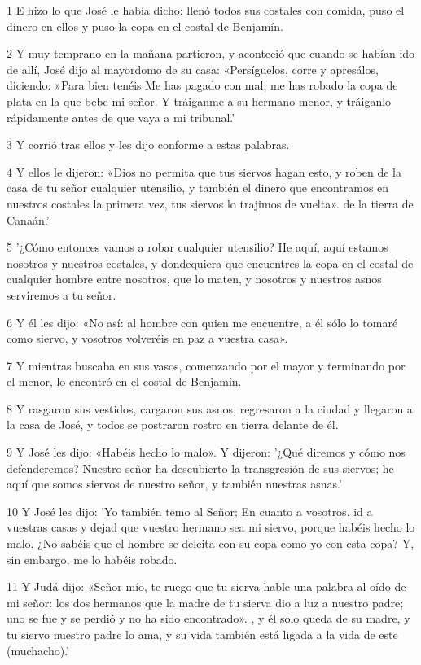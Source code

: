 \par 1 E hizo lo que José le había dicho: llenó todos sus costales con comida, puso el dinero en ellos y puso la copa en el costal de Benjamín.
\par 2 Y muy temprano en la mañana partieron, y aconteció que cuando se habían ido de allí, José dijo al mayordomo de su casa: «Persíguelos, corre y apresálos, diciendo: »Para bien tenéis Me has pagado con mal; me has robado la copa de plata en la que bebe mi señor. Y tráiganme a su hermano menor, y tráiganlo rápidamente antes de que vaya a mi tribunal.'
\par 3 Y corrió tras ellos y les dijo conforme a estas palabras.
\par 4 Y ellos le dijeron: «Dios no permita que tus siervos hagan esto, y roben de la casa de tu señor cualquier utensilio, y también el dinero que encontramos en nuestros costales la primera vez, tus siervos lo trajimos de vuelta». de la tierra de Canaán.'
\par 5 '¿Cómo entonces vamos a robar cualquier utensilio? He aquí, aquí estamos nosotros y nuestros costales, y dondequiera que encuentres la copa en el costal de cualquier hombre entre nosotros, que lo maten, y nosotros y nuestros asnos serviremos a tu señor.
\par 6 Y él les dijo: «No así: al hombre con quien me encuentre, a él sólo lo tomaré como siervo, y vosotros volveréis en paz a vuestra casa».
\par 7 Y mientras buscaba en sus vasos, comenzando por el mayor y terminando por el menor, lo encontró en el costal de Benjamín.
\par 8 Y rasgaron sus vestidos, cargaron sus asnos, regresaron a la ciudad y llegaron a la casa de José, y todos se postraron rostro en tierra delante de él.
\par 9 Y José les dijo: «Habéis hecho lo malo». Y dijeron: '¿Qué diremos y cómo nos defenderemos? Nuestro señor ha descubierto la transgresión de sus siervos; he aquí que somos siervos de nuestro señor, y también nuestras asnas.'
\par 10 Y José les dijo: 'Yo también temo al Señor; En cuanto a vosotros, id a vuestras casas y dejad que vuestro hermano sea mi siervo, porque habéis hecho lo malo. ¿No sabéis que el hombre se deleita con su copa como yo con esta copa? Y, sin embargo, me lo habéis robado.
\par 11 Y Judá dijo: «Señor mío, te ruego que tu sierva hable una palabra al oído de mi señor: los dos hermanos que la madre de tu sierva dio a luz a nuestro padre; uno se fue y se perdió y no ha sido encontrado». , y él solo queda de su madre, y tu siervo nuestro padre lo ama, y ​​su vida también está ligada a la vida de este (muchacho).'

